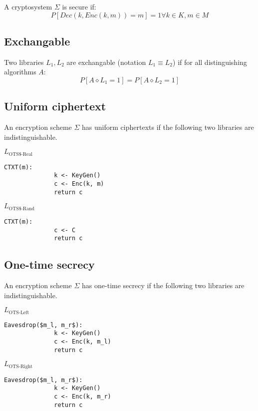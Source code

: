 \documentclass[a4paper]{scrreprt}
\begin{document}
A cryptosystem $\Sigma$ is secure if:
\[
	P[Dec(k, Enc(k, m)) = m] = 1 \forall k \in K, m \in M
\]

\subsection{Exchangable}

Two libraries $L_1, L_2$ are exchangable (notation $L_1 \equiv L_2$) if for all distinguishing algorithms $A$:
\[
	P[A \diamond L_1 = 1] = P[A \diamond L_2 = 1]
\]

\subsection{Uniform ciphertext}

An encryption scheme $\Sigma$ has uniform ciphertexts if the following two
libraries are indistinguishable.

\begin{tcbraster}[raster columns=2,raster equal height,nobeforeafter,raster column skip=2cm]
	\begin{library}{$L_{\text{OTS\$-Real}}$}
		\begin{lstlisting}[mathescape=true,autogobble=true]
			CTXT(m):
			  k <- KeyGen()
			  c <- Enc(k, m)
			  return c
		\end{lstlisting}
	\end{library}
	\begin{library}{$L_{\text{OTS\$-Rand}}$}
		\begin{lstlisting}[mathescape=true,autogobble=true]
			CTXT(m):
			  c <- C
			  return c
		\end{lstlisting}
	\end{library}
\end{tcbraster}


\subsection{One-time secrecy}

An encryption scheme $\Sigma$ has one-time secrecy if the following two
libraries are indistinguishable.

\begin{tcbraster}[raster columns=2,raster equal height,nobeforeafter,raster column skip=2cm]
	\begin{library}{$L_{\text{OTS-Left}}$}
		\begin{lstlisting}[mathescape=true,autogobble=true]
			Eavesdrop($m_l, m_r$):
			  k <- KeyGen()
			  c <- Enc(k, m_l)
			  return c
		\end{lstlisting}
	\end{library}
	\begin{library}{$L_{\text{OTS-Right}}$}
		\begin{lstlisting}[mathescape=true,autogobble=true]
			Eavesdrop($m_l, m_r$):
			  k <- KeyGen()
			  c <- Enc(k, m_r)
			  return c
		\end{lstlisting}
	\end{library}
\end{tcbraster}
\end{document}
